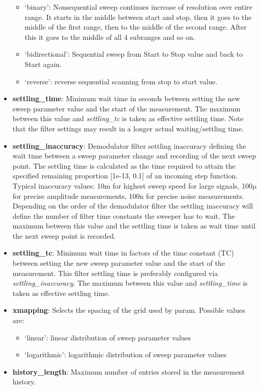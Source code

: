 \documentclass[11pt]{article} %
\begin{document}
\begin{itemize}
\begin{itemize}[]
	\item `binary': Nonsequential sweep continues increase of resolution over entire range. It starts in the middle between start and stop, then it goes to the middle of the first range, then to the middle of the second range. After this it goes to the middle of all 4 subranges and so on.
	\item `bidirectional': Sequential sweep from Start to Stop value and back to Start again.
	\item `reverse': reverse sequential scanning from stop to start value.
	\end{itemize}
\item {\bf settling\_time}: Minimum wait time in seconds between setting the new sweep parameter value and the start of the measurement. The maximum between this value and {\it settling\_tc} is taken as effective settling time. Note that the filter settings may result in a longer actual waiting/settling time.
\item {\bf settling\_inaccuracy}: Demodulator filter settling inaccuracy defining the wait time between a sweep parameter change and recording of the next sweep point. The settling time is calculated as the time required to attain the specified remaining proportion [1e-13, 0.1] of an incoming step function. Typical inaccuracy values: 10m for highest sweep speed for large signals, 100$\mu$ for precise amplitude measurements, 100n for precise noise measurements. Depending on the order of the demodulator filter the settling inaccuracy will define the number of filter time constants the sweeper has to wait. The maximum between this value and the settling time is taken as wait time until the next sweep point is recorded.
\item {\bf settling\_tc}: Minimum wait time in factors of the time constant (TC) between setting the new sweep parameter value and the start of the measurement. This filter settling time is preferably configured via {\it settling\_inaccuracy}. The maximum between this value and {\it settling\_time} is taken as effective settling time.
\item {\bf xmapping}: Selects the spacing of the grid used by param. Possible values are:
	\begin{itemize}[]
	\itemsep0pt
	\item `linear': linear distribution of sweep parameter values
	\item `logarithmic': logarithmic distribution of sweep parameter values
\end{itemize}
\item {\bf history\_length}: Maximum number of entries stored in the measurement history.

\end{itemize}
\end{document}
